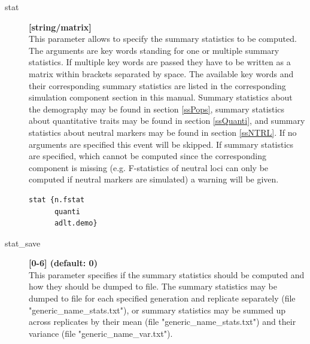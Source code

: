 \documentclass[letterpaper,12pt,oneside]{book}
\begin{document}
\begin{description}
\item[stat] \textbf{[string/matrix]}\\
This parameter allows to specify the summary statistics to be computed. The arguments are key words standing for one or multiple summary statistics. If multiple key words are passed they have to be written as a matrix within brackets separated by space. The available key words and their corresponding summary statistics are listed in the corresponding simulation component section in this manual. Summary statistics about the demography may be found in section \ref{ssPops}, summary statistics about quantitative traits may be found in section \ref{ssQuanti}, and summary statistics about neutral markers may be found in section \ref{ssNTRL}. If no arguments are specified this event will be skipped. If summary statistics are specified, which cannot be computed since the corresponding component is missing (e.g. F-statistics of neutral loci can only be computed if neutral markers are simulated) a warning will be given.   
\begin{lstlisting}[frame=single]
stat {n.fstat 
      quanti 
      adlt.demo}
\end{lstlisting}

\item[stat\_save] \textbf{[0-6] (default: 0)}\\
This parameter specifies if the summary statistics should be computed and how they should be dumped to file. The summary statistics may be dumped to file for each specified generation and replicate separately (file "generic\_name\_stats.txt"), or summary statistics may be summed up across replicates by their mean (file "generic\_name\_stats.txt") and their variance (file "generic\_name\_var.txt").
\begin{description}


\end{description}
\end{description}
\end{document}
